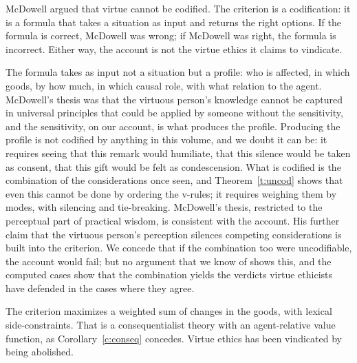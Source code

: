 \documentclass{situationist-preprint}
\begin{document}
\begin{objection}\label{o:mcdowell}
McDowell argued that virtue cannot be codified. The criterion is a codification: it is a formula that takes a situation as input and returns the right options. If the formula is correct, McDowell was wrong; if McDowell was right, the formula is incorrect. Either way, the account is not the virtue ethics it claims to vindicate.
\end{objection}

\begin{reply}
The formula takes as input not a situation but a profile: who is affected, in which goods, by how much, in which causal role, with what relation to the agent. McDowell's thesis was that the virtuous person's knowledge cannot be captured in universal principles that could be applied by someone without the sensitivity, and the sensitivity, on our account, is what produces the profile. Producing the profile is not codified by anything in this volume, and we doubt it can be: it requires seeing that this remark would humiliate, that this silence would be taken as consent, that this gift would be felt as condescension. What is codified is the combination of the considerations once seen, and Theorem~\ref{t:uncod} shows that even this cannot be done by ordering the v-rules; it requires weighing them by modes, with silencing and tie-breaking. McDowell's thesis, restricted to the perceptual part of practical wisdom, is consistent with the account. His further claim that the virtuous person's perception silences competing considerations is built into the criterion. We concede that if the combination too were uncodifiable, the account would fail; but no argument that we know of shows this, and the computed cases show that the combination yields the verdicts virtue ethicists have defended in the cases where they agree.
\end{reply}

\begin{objection}\label{o:conseq}
The criterion maximizes a weighted sum of changes in the goods, with lexical side-constraints. That is a consequentialist theory with an agent-relative value function, as Corollary~\ref{c:conseq} concedes. Virtue ethics has been vindicated by being abolished.
\end{objection}
\end{document}

